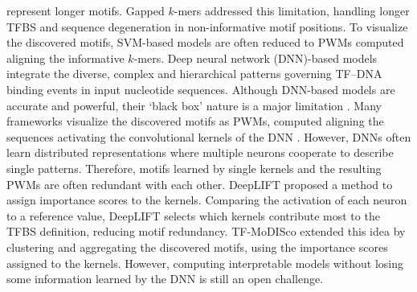 \documentclass[a4paper, titlepage, openright]{book}
\begin{document}
represent longer motifs. Gapped $k$-mers \citep{ghandi2014robust} addressed this limitation, handling longer TFBS and sequence degeneration in non-informative motif positions. To visualize the discovered motifs, SVM-based models are often reduced to PWMs computed aligning the informative $k$-mers. Deep neural network (DNN)-based models integrate the diverse, complex and hierarchical patterns governing TF–DNA binding events in input nucleotide sequences. Although DNN-based models are accurate and powerful, their ‘black box’ nature is a major limitation \citep{park2020enhancing}. Many frameworks visualize the discovered motifs as PWMs, computed aligning the sequences activating the convolutional kernels of the DNN \citep{koo2020deep}. However, DNNs often learn distributed representations where multiple neurons cooperate to describe single patterns. Therefore, motifs learned by single kernels and the resulting PWMs are often redundant with each other. DeepLIFT \citep{shrikumar2017learning} proposed a method to assign importance scores to the kernels. Comparing the activation of each neuron to a reference value, DeepLIFT selects which kernels contribute most to the TFBS definition, reducing motif redundancy. TF-MoDISco \citep{avsec2021base} extended this idea by clustering and aggregating the discovered motifs, using the importance scores assigned to the kernels. However, computing interpretable models without losing some information learned by the DNN is still an open challenge.
\end{document}
